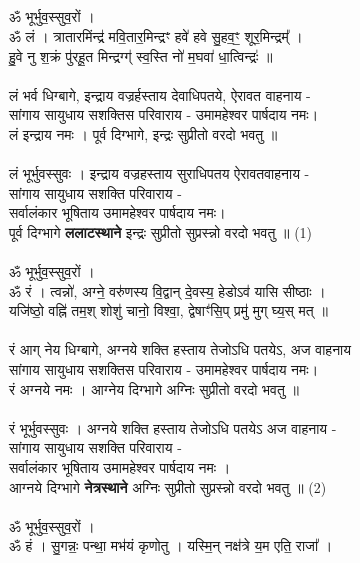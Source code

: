\subsection{}
ॐ भूर्भुव॒स्सुव॒रों ।\\
ॐ लं । त्रातारमिंन्द्र॑ मवि॒तार॒मिन्द्रꣳ हवे॑ हवे सु॒हव॒ꣳ॒ शूर॒मिन्द्रम्᳚ । \\
हु॒वे नु श॒क्रं पु॑रहू॒त मिन्द्रग्ग्॑ स्व॒स्ति नो॑ म॒घवा॑ धा॒त्विन्द्रः॑ ॥\\
\\
{\small लं भर्व धिग्बागे, इन्द्राय वज्रर्हस्ताय देवाधिपतये, ऐरावत वाहनाय - \\
सांगाय सायुधाय सशक्तिस परिवाराय -  उमामहेश्वर पार्षदाय नमः।\\
लं इन्द्राय नमः ।  पूर्व दिग्भागे, इन्द्रः सुप्रीतो  वरदो भवतु ॥} \\
\\
लं भूर्भुवस्सुवः । इन्द्राय वज्रहस्ताय सुराधिपतय ऐरावतवाहनाय -\\
सांगाय सायुधाय सशक्ति परिवाराय -\\
सर्वालंकार भूषिताय उमामहेश्वर पार्षदाय नमः।\\
पूर्व दिग्भागे \textbf{ललाटस्थाने} इन्द्रः सुप्रीतो सुप्रस्न्नो वरदो भवतु ॥  (1)\\
\\
ॐ भूर्भुव॒स्सुव॒रों ।\\
{\small ॐ} रं । त्वन्नो॑, अग्ने॒ वरु॑णस्य वि॒द्वान् दे॒वस्य॒ हेडोऽव॑ यासि सीष्ठाः ।\\
यजि॑ष्ठो॒  वह्नि॑ तम॒श् शोशु॑ चानो॒ विश्वा॒, द्वेषाꣳ॑सि॒प् प्रमु॑ मुग् घ्य॒स् मत् ॥ \\
\\
{\small रं आग् नेय धिग्बागे, अग्नये शक्ति हस्ताय तेजोऽधि पतयेऽ, अज वाहनाय\\
सांगाय सायुधाय सशक्तिस परिवाराय - उमामहेश्वर पार्षदाय नमः।\\
रं अग्नये नमः । आग्नेय दिग्भागे अग्निः सुप्रीतो  वरदो भवतु ॥}\\
\\
रं भूर्भुवस्सुवः । अग्नये शक्ति हस्ताय तेजोऽधि पतयेऽ अज वाहनाय -\\
सांगाय सायुधाय सशक्ति परिवाराय -\\
सर्वालंकार भूषिताय उमामहेश्वर पार्षदाय नमः ।\\
आग्नये दिग्भागे \textbf{नेत्रस्थाने} अग्निः सुप्रीतो सुप्रस्न्नो वरदो भवतु ॥ (2)\\
\\
ॐ भूर्भुव॒स्सुव॒रों ।\\
{\small ॐ} हं । सु॒गन्नः॒ पन्था॒ मभ॑यं कृणोतु । यस्मि॒न् नक्ष॑त्रे य॒म एति॒ राजा᳚ ।\\
